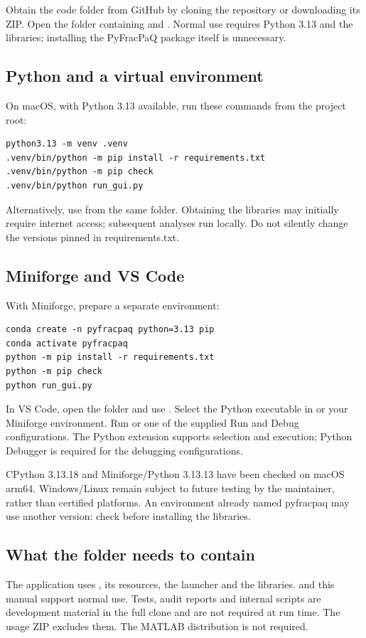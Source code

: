 \label{sec:inicio}
Obtain the code folder from GitHub by cloning the repository or downloading its ZIP. Open the folder containing  and . Normal use requires Python 3.13 and the libraries; installing the PyFracPaQ package itself is unnecessary.

\subsection{Python and a virtual environment}
On macOS, with Python 3.13 available, run these commands from the project root:
\begin{verbatim}
python3.13 -m venv .venv
.venv/bin/python -m pip install -r requirements.txt
.venv/bin/python -m pip check
.venv/bin/python run_gui.py
\end{verbatim}
Alternatively, use  from the same folder. Obtaining the libraries may initially require internet access; subsequent analyses run locally. Do not silently change the versions pinned in requirements.txt.

\subsection{Miniforge and VS Code}
With Miniforge, prepare a separate environment:
\begin{verbatim}
conda create -n pyfracpaq python=3.13 pip
conda activate pyfracpaq
python -m pip install -r requirements.txt
python -m pip check
python run_gui.py
\end{verbatim}
In VS Code, open the folder and use . Select the Python executable in  or your Miniforge environment. Run  or one of the supplied Run and Debug configurations. The Python extension supports selection and execution; Python Debugger is required for the debugging configurations.

CPython 3.13.18 and Miniforge/Python 3.13.13 have been checked on macOS arm64. Windows/Linux remain subject to future testing by the maintainer, rather than certified platforms. An environment already named pyfracpaq may use another version: check  before installing the libraries.

\subsection{What the folder needs to contain}
The application uses , its resources, the launcher and the libraries.  and this manual support normal use. Tests, audit reports and internal scripts are development material in the full clone and are not required at run time. The usage ZIP excludes them. The MATLAB distribution is not required.

